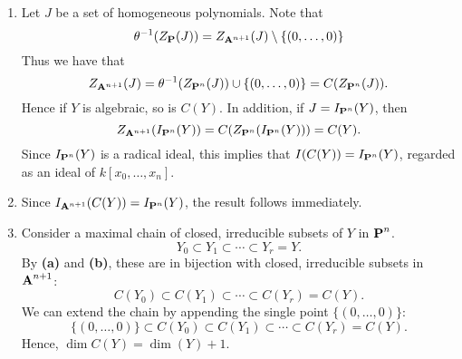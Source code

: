 \documentclass[10pt]{amsart}
\begin{document}
\begin{solution}
    \begin{luke}
        \begin{enumerate}
            \item 
            Let $J$ be a set of homogeneous polynomials. Note that 
            \[
                \theta^{-1}(Z_{\pp}(J)) = Z_{\aa^{n+1}}(J) \setminus\{(0,\dots,0)\}
            \]
            Thus we have that
            \[
                Z_{\aa^{n+1}}(J) = \theta^{-1}(Z_{\pp^n}(J)) \cup \{(0,\dots,0)\} = C(Z_{\pp^n}(J)).
            \]
            Hence if $Y$ is algebraic, so is $C(Y)$. In addition, if $J = I_{\pp^n}(Y)$, then 
            \[
                Z_{\aa^{n+1}}(I_{\pp^n}(Y)) = C(Z_{\pp^n}(I_{\pp^n}(Y))) = C(Y).
            \]
            Since $I_{\pp^n}(Y)$ is a radical ideal, this implies that $I(C(Y)) = I_{\pp^n}(Y)$, regarded 
            as an ideal of $k[x_0, \dots, x_n]$.

            \item Since $I_{\aa^{n+1}}(C(Y)) = I_{\pp^n}(Y)$, the result follows immediately.
            
            \item Consider a maximal chain of closed, irreducible subsets of $Y$ in $\pp^n$. 
            \[
                Y_0 \subset Y_1 \subset \cdots \subset Y_r = Y.
            \]
            By {\bf (a)} and {\bf (b)}, these are in bijection with closed, irreducible 
            subsets in $\aa^{n+1}$:
            \[
                C(Y_0) \subset C(Y_1) \subset \cdots \subset C(Y_r) = C(Y).
            \]
            We can extend the chain by appending the single point $\{(0,\dots, 0)\}$:
            \[
                \{(0, \dots, 0)\} \subset C(Y_0) \subset C(Y_1) \subset \cdots \subset C(Y_r) = C(Y).
            \]
            Hence, $\dim C(Y) = \dim(Y) + 1$. 

        \end{enumerate}
    \end{luke}
\end{solution}
\end{document}
